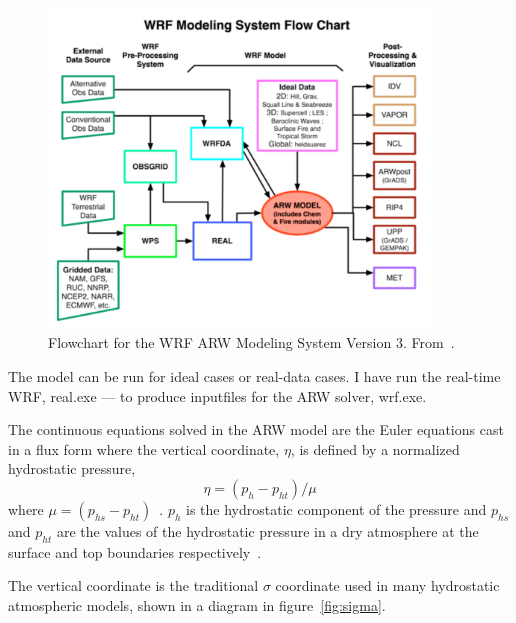 \begin{figure}
\centering
\includegraphics[width=0.9\textwidth]{model_methods/wrfflowchart}
\caption{Flowchart for the WRF ARW Modeling System Version 3. From~\citet{Wang2015}.}
\label{fig:wrfflowchart}
\end{figure}

The model can be run for ideal cases or real-data cases. I have run the real-time WRF, real.exe — to produce inputfiles for the ARW solver, wrf.exe.

The continuous equations solved in the ARW model are the Euler equations cast in a flux form where the vertical coordinate, $\eta$, is defined by a normalized hydrostatic pressure,
\begin{equation}
\eta = (p_h - p_{ht})/\mu 
\end{equation}
where $\mu = (p_{hs} - p_{ht})$~\citep{Skamarock2008}. $p_h$ is the hydrostatic component of the pressure and $p_{hs}$ and $p_{ht}$ are the values of the hydrostatic pressure in a dry atmosphere at the surface and top boundaries respectively~\citep{Skamarock2008}.

The vertical coordinate is the traditional $\sigma$ coordinate used in many hydrostatic atmospheric models, shown in a diagram in figure~\ref{fig:sigma}.

